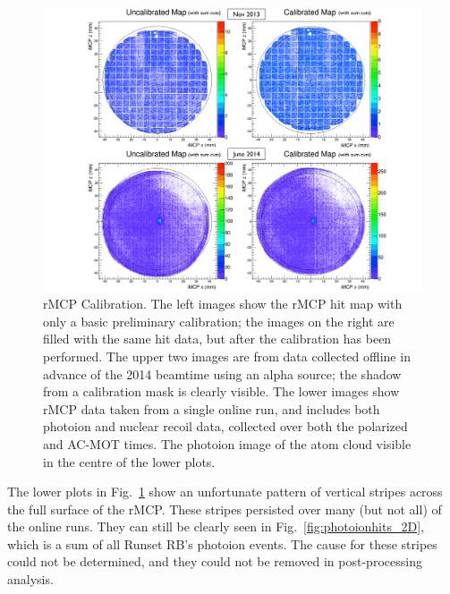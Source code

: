 \begin{figure}[h!tb]
	\centering
	\includegraphics[width=.999\linewidth]
	{Figures/rMCP_Calibration}
	\caption[rMCP Calibration]{rMCP Calibration.  The left images show the rMCP hit map with only a basic preliminary calibration; the images on the right are filled with the same hit data, but after the calibration has been performed.  The upper two images are from data collected offline in advance of the 2014 beamtime using an alpha source; the shadow from a calibration mask is clearly visible.  The lower images show rMCP data taken from a single online run, and includes both photoion and nuclear recoil data, collected over both the polarized and AC-MOT times.  The photoion image of the atom cloud visible in the centre of the lower plots.}
	\label{fig:rmcp_calibration}
\end{figure}

The lower plots in Fig.~\ref{fig:rmcp_calibration} show an unfortunate pattern of vertical stripes across the full surface of the rMCP.  These stripes persisted over many (but not all) of the online runs.  They can still be clearly seen in Fig.~\ref{fig:photoionhits_2D}, which is a sum of all Runset RB's photoion events. The cause for these stripes could not be determined, and they could not be removed in post-processing analysis.  

